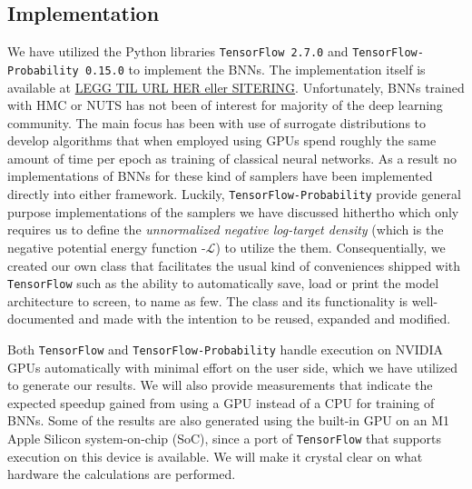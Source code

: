 \subsection{Implementation}
We have utilized the Python libraries {\tt TensorFlow 2.7.0} and {\tt TensorFlow-Probability 0.15.0} to implement the BNNs. 
The implementation itself is available at \url{LEGG TIL URL HER eller SITERING}. Unfortunately, BNNs trained with HMC or NUTS has not been of interest for majority of the deep learning community. The main focus has been with use of surrogate distributions to develop algorithms that when employed using GPUs spend roughly the same amount of time per epoch as training of classical neural networks. As a result no implementations of BNNs for these kind of samplers have been implemented directly into either framework. Luckily, {\tt TensorFlow-Probability} provide general purpose implementations of the samplers we have discussed hithertho 
which only requires us to define the \textit{unnormalized negative log-target density} (which is the negative potential energy function -$\mathcal{L}$) to utilize the them. 
Consequentially, we created our own class that facilitates the usual kind of conveniences shipped with {\tt TensorFlow} such as the ability to automatically save, load or print the model architecture to screen, to name as few. The class and its functionality is well-documented and made with the intention to be reused, expanded and modified. 

Both {\tt TensorFlow} and {\tt TensorFlow-Probability} handle execution on NVIDIA GPUs automatically with minimal effort on the user side, which we have utilized to generate our results. We will also provide measurements that indicate the expected speedup gained from using a GPU instead of a CPU for training of BNNs. Some of the results are also generated using the built-in GPU on an M1 Apple Silicon system-on-chip (SoC), since a port of {\tt TensorFlow} that supports execution on this device is available. We will make it crystal clear on what hardware the calculations are performed.
 

